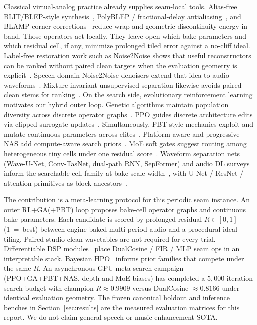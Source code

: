 Classical virtual-analog practice already supplies seam-local tools.
Alias-free BLIT/BLEP-style synthesis~\cite{stilson1996}, PolyBLEP / fractional-delay antialiasing~\cite{nam2009polyblep}, and BLAMP corner corrections~\cite{esqueda2016blamp} reduce wrap and geometric discontinuity energy in-band.
Those operators act locally.
They leave open which bake parameters and which residual cell, if any, minimize prolonged tiled error against a no-cliff ideal.
Label-free restoration work such as Noise2Noise shows that useful reconstructors can be ranked without paired clean targets when the evaluation geometry is explicit~\cite{lehtinen2018}.
Speech-domain Noise2Noise denoisers extend that idea to audio waveforms~\cite{kashyap2021n2n}.
Mixture-invariant unsupervised separation likewise avoids paired clean stems for ranking~\cite{wisdom2020}.
On the search side, evolutionary reinforcement learning motivates our hybrid outer loop.
Genetic algorithms maintain population diversity across discrete operator graphs~\cite{real2019}.
PPO guides discrete architecture edits via clipped surrogate updates~\cite{schulman2017}.
Simultaneously, PBT-style mechanics exploit and mutate continuous parameters across elites~\cite{jaderberg2017}.
Platform-aware and progressive NAS add compute-aware search priors~\cite{tan2019mnasnet,liu2018pnas}.
MoE soft gates suggest routing among heterogeneous tiny cells under one residual score~\cite{shazeer2017}.
Waveform separation nets (Wave-U-Net, Conv-TasNet, dual-path RNN, SepFormer) and audio DL surveys inform the searchable cell family at bake-scale width~\cite{stoller2018,macartney2018,luo2019,luo2020dprnn,subakan2021,purwins2019,gong2021ast}, with U-Net / ResNet / attention primitives as block ancestors~\cite{ronneberger2015,he2016resnet,vaswani2017,jansson2017}.

The contribution is a meta-learning protocol for this periodic seam instance.
An outer RL+GA(+PBT) loop proposes bake-cell operator graphs and continuous bake parameters.
Each candidate is scored by prolonged residual $R\in[0,1]$ (1~=~best) between engine-baked multi-period audio and a procedural ideal tiling.
Paired studio-clean wavetables are not required for every trial.
Differentiable DSP modules~\cite{engel2020} place DualCosine / FIR / MLP seam ops in an interpretable stack.
Bayesian HPO~\cite{snoek2012} informs prior families that compete under the same $R$.
An asynchronous GPU meta-search campaign (PPO+GA+PBT+NAS, depth and MoE biases) has completed a $5{,}000$-iteration search budget with champion $R\approx 0.9909$ versus DualCosine $\approx 0.8166$ under identical evaluation geometry.
The frozen canonical holdout and inference benches in Section~\ref{sec:results} are the measured evaluation matrices for this report.
We do not claim general speech or music enhancement SOTA.

